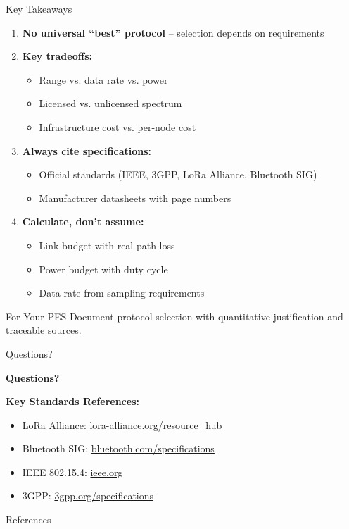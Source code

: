 \documentclass[aspectratio=169,11pt]{beamer}
\begin{document}
\begin{frame}{Key Takeaways}
    \begin{enumerate}
        \item \textbf{No universal ``best'' protocol} -- selection depends on requirements
        
        \item \textbf{Key tradeoffs:}
        \begin{itemize}
            \item Range vs. data rate vs. power
            \item Licensed vs. unlicensed spectrum
            \item Infrastructure cost vs. per-node cost
        \end{itemize}
        
        \item \textbf{Always cite specifications:}
        \begin{itemize}
            \item Official standards (IEEE, 3GPP, LoRa Alliance, Bluetooth SIG)
            \item Manufacturer datasheets with page numbers
        \end{itemize}
        
        \item \textbf{Calculate, don't assume:}
        \begin{itemize}
            \item Link budget with real path loss
            \item Power budget with duty cycle
            \item Data rate from sampling requirements
        \end{itemize}
    \end{enumerate}
    
    \vspace{0.3cm}
    \begin{block}{For Your PES}
        Document protocol selection with quantitative justification and traceable sources.
    \end{block}
\end{frame}

\begin{frame}{Questions?}
    \begin{center}
        \Large
        \textbf{Questions?}
        
        \vspace{1cm}
        \normalsize
        \textbf{Key Standards References:}
        \begin{itemize}
            \item LoRa Alliance: \url{lora-alliance.org/resource_hub}
            \item Bluetooth SIG: \url{bluetooth.com/specifications}
            \item IEEE 802.15.4: \url{ieee.org}
            \item 3GPP: \url{3gpp.org/specifications}
        \end{itemize}
    \end{center}
\end{frame}


\begin{frame}[allowframebreaks]{References}
    \printbibliography
\end{frame}
\end{document}
